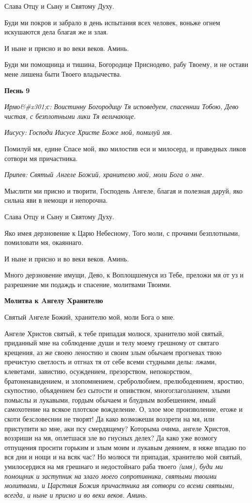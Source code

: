 Слава Отцу и Сыну и Святому Духу.


Буди ми покров и забрало в день испытания всех человек, воньже огнем искушаются дела благая же и злая.


И ныне и присно и во веки веков. Аминь.


Буди ми помощница и тишина, Богородице Приснодево, рабу Твоему, и не остави мене лишена быти Твоего владычества.




\bfseries Песнь 9\normalfont{}


\itshape Ирмо&#x301;с:\normalfont{} Воистинну Богородицу Тя исповедуем, спасеннии Тобою, Дево чистая, с безплотными лики Тя величающе.


\itshape Иисусу:\normalfont{} Господи Иисусе Христе Боже мой, помилуй мя.


Помилуй мя, едине Спасе мой, яко милостив еси и милосерд, и праведных ликов сотвори мя причастника.


\itshape Припев:\normalfont{} Святый Aнгеле Божий, хранителю мой, моли Бога о мне.


Мыслити ми присно и творити, Господень Aнгеле, благая и полезная даруй, яко сильна яви в немощи и непорочна.


Слава Отцу и Сыну и Святому Духу.


Яко имея дерзновение к Царю Небесному, Того моли, с прочими безплотными, помиловати мя, окаяннаго.


И ныне и присно и во веки веков. Аминь.


Много дерзновение имущи, Дево, к Воплощшемуся из Тебе, преложи мя от уз и разрешение ми подаждь и спасение, молитвами Твоими.




\bfseries Молитва к Aнгелу Xранителю\normalfont{}


Святый Aнгеле Божий, хранителю мой, моли Бога о мне.


Ангеле Христов святый, к тебе припадая молюся, хранителю мой святый, приданный мне на соблюдение души и телу моему грешному от святаго крещения, аз же своею леностию и своим злым обычаем прогневах твою пречистую светлость и отгнах тя от себе всеми студными делы: лжами, клеветами, завистию, осуждением, презорством, непокорством, братоненавидением, и злопомнением, сребролюбием, прелюбодеянием, яростию, скупостию, объядением без сытости и опивством, многоглаголанием, злыми помыслы и лукавыми, гордым обычаем и блудным возбешением, имый самохотение на всякое плотское вожделение. О, злое мое произволение, егоже и скоти безсловеснии не творят! Да како возможеши воззрети на мя, или приступити ко мне, аки псу смердящему? Которыма очима, ангеле Христов, воззриши на мя, оплетшася зле во гнусных делех? Да како уже возмогу отпущения просити горьким и злым моим и лукавым деянием, в няже впадаю по вся дни и нощи и на всяк час? Но молюся ти припадая, хранителю мой святый, умилосердися на мя грешнаго и недостойнаго раба твоего \itshape (имя)\normalfont{}, буди ми помощник и заступник на злаго моего сопротивника, святыми твоими молитвами, и Царствия Божия причастника мя сотвори со всеми святыми, всегда, и ныне и присно и во веки веков. Аминь.


